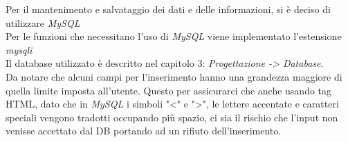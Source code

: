 Per il mantenimento e salvataggio dei dati e delle informazioni, si è deciso di utilizzare \emph{MySQL}\\
Per le funzioni che necessitano l'uso di \emph{MySQL} viene implementato l'estensione \emph{mysqli}\\
Il database utilizzato è descritto nel capitolo 3: \emph{Progettazione -> Database}.
\\
Da notare che alcuni campi per l'inserimento hanno una grandezza maggiore di quella limite imposta all'utente. 
Questo per assicurarci che anche usando tag HTML, dato che in \emph{MySQL} i simboli "<" e ">", le lettere accentate e caratteri speciali vengono tradotti occupando più spazio, ci sia il rischio che l'input non venisse accettato dal DB portando ad un rifiuto dell'inserimento.